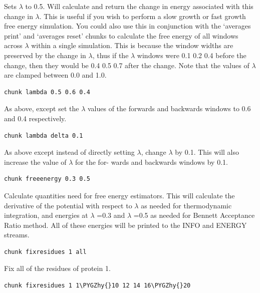 \documentclass[letterpaper,10pt,english]{sphinxmanual}
\def\PYGZhy{\char`\-}
\begin{document}
Sets \(\lambda\) to 0.5. Will calculate and return the change in energy associated with this change in \(\lambda\). This is useful if you wish to perform a slow growth or fast growth free energy simulation. You could also use this in conjunction with the ‘averages print’ and ‘averages reset’ chunks to calculate the free energy of all windows across \(\lambda\) within a single simulation. This is because the window widths are preserved by the change in \(\lambda\), thus if the \(\lambda\) windows were 0.1 0.2 0.4 before the change, then they would be 0.4 0.5 0.7 after the change. Note that the values of \(\lambda\) are clamped between 0.0 and 1.0.

\begin{Verbatim}[commandchars=\\\{\}]
chunk lambda 0.5 0.6 0.4
\end{Verbatim}

As above, except set the \(\lambda\) values of the forwards and backwards windows to 0.6 and 0.4 respectively.

\begin{Verbatim}[commandchars=\\\{\}]
chunk lambda delta 0.1
\end{Verbatim}

As above except instead of directly setting \(\lambda\), change \(\lambda\) by 0.1. This will also increase the value of \(\lambda\) for the for- wards and backwards windows by 0.1.

\begin{Verbatim}[commandchars=\\\{\}]
chunk freeenergy 0.3 0.5
\end{Verbatim}

Calculate quantities need for free energy estimators. This will calculate the derivative of the potential with respect to \(\lambda\) as needed for thermodynamic integration, and energies at \(\lambda\) =0.3 and \(\lambda\) =0.5 as needed for Bennett Acceptance Ratio method. All of these energies will be printed to the INFO and ENERGY streams.

\begin{Verbatim}[commandchars=\\\{\}]
chunk fixresidues 1 all
\end{Verbatim}

Fix all of the residues of protein 1.

\begin{Verbatim}[commandchars=\\\{\}]
chunk fixresidues 1 1\PYGZhy{}10 12 14 16\PYGZhy{}20
\end{Verbatim}
\end{document}
